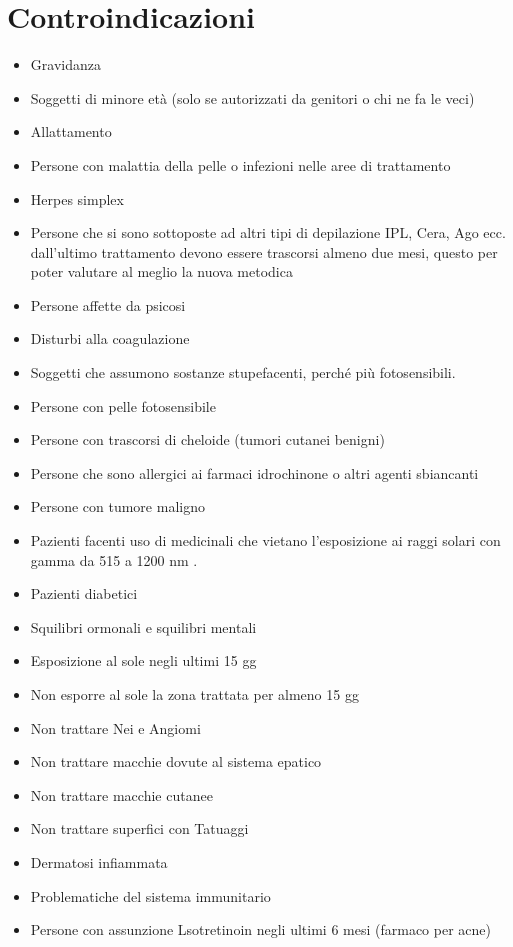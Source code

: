 \documentclass[10pt]{article}
\begin{document}
\section{Controindicazioni}
\begin{itemize}
  \item Gravidanza
  \item Soggetti di minore età (solo se autorizzati da genitori o chi ne fa le veci)
  \item Allattamento
  \item Persone con malattia della pelle o infezioni nelle aree di trattamento
  \item Herpes simplex
  \item Persone che si sono sottoposte ad altri tipi di depilazione IPL, Cera, Ago ecc. dall'ultimo trattamento devono essere trascorsi almeno due mesi, questo per poter valutare al meglio la nuova metodica
  \item Persone affette da psicosi
  \item Disturbi alla coagulazione
  \item Soggetti che assumono sostanze stupefacenti, perché più fotosensibili.
  \item Persone con pelle fotosensibile
  \item Persone con trascorsi di cheloide (tumori cutanei benigni)
  \item Persone che sono allergici ai farmaci idrochinone o altri agenti sbiancanti
  \item Persone con tumore maligno
  \item Pazienti facenti uso di medicinali che vietano l'esposizione ai raggi solari con gamma da 515 a 1200 nm .
  \item Pazienti diabetici
  \item Squilibri ormonali e squilibri mentali
  \item Esposizione al sole negli ultimi 15 gg
  \item Non esporre al sole la zona trattata per almeno 15 gg
  \item Non trattare Nei e Angiomi
  \item Non trattare macchie dovute al sistema epatico
  \item Non trattare macchie cutanee
  \item Non trattare superfici con Tatuaggi
  \item Dermatosi infiammata
  \item Problematiche del sistema immunitario
  \item Persone con assunzione Lsotretinoin negli ultimi 6 mesi (farmaco per acne)

\end{itemize}
\end{document}
